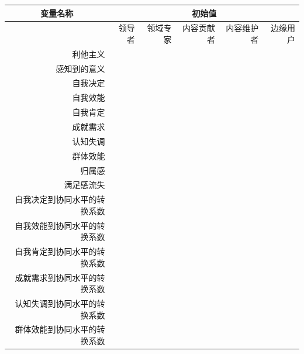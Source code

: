 \begin{table}[htb]
  \centering
\small
\begin{tabular}{|r|r|r|r|r|r|}
\hline
\multicolumn{ 1}{|c|}{变量名称} &                                     \multicolumn{ 5}{|c|}{初始值} \\
\hline
\multicolumn{ 1}{|c|}{} &        领导者 &       领域专家 &      内容贡献者 &      内容维护者 &       边缘用户 \\
\hline
      利他主义 &            &            &            &            &            \\
\hline
    感知到的意义 &            &            &            &            &            \\
\hline
      自我决定 &            &            &            &            &            \\
\hline
      自我效能 &            &            &            &            &            \\
\hline
      自我肯定 &            &            &            &            &            \\
\hline
      成就需求 &            &            &            &            &            \\
\hline
      认知失调 &            &            &            &            &            \\
\hline
      群体效能 &            &            &            &            &            \\
\hline
       归属感 &            &            &            &            &            \\
\hline
     满足感流失 &            &            &            &            &            \\
\hline
自我决定到协同水平的转换系数 &            &            &            &            &            \\
\hline
自我效能到协同水平的转换系数 &            &            &            &            &            \\
\hline
自我肯定到协同水平的转换系数 &            &            &            &            &            \\
\hline
成就需求到协同水平的转换系数 &            &            &            &            &            \\
\hline
认知失调到协同水平的转换系数 &            &            &            &            &            \\
\hline
群体效能到协同水平的转换系数 &            &            &            &            &            \\

\end{tabular}
\end{table}
